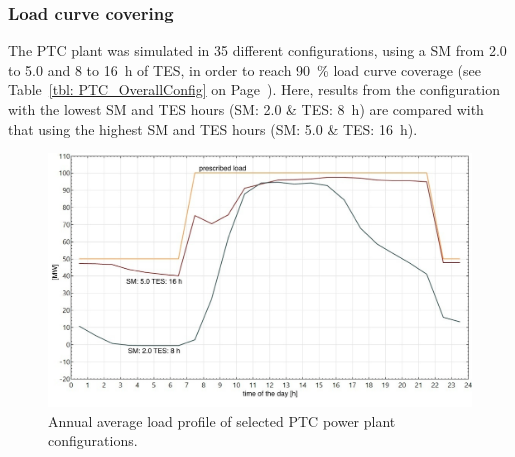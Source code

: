 \subsubsection{Load curve covering}
The PTC plant was simulated in 35 different configurations, using a SM from \num{2.0} to \num{5.0} and \num{8} to \SI{16}{h} of TES, in order to reach \SI{90}{\percent} load curve coverage (see Table~\ref{tbl: PTC_OverallConfig} on Page~\pageref{tbl: PTC_OverallConfig}). Here, results from the configuration with the lowest SM and TES hours (SM: \num{2.0} \& TES: \SI{8}{h}) are compared with that using the highest SM and TES hours  (SM: \num{5.0} \& TES: \SI{16}{h}).  

\begin{figure}[htbp]  
\centering
\includegraphics[width=0.8\linewidth]{FIG/PTC_annual_profil}
\caption[Annual average load profile of selected PTC power plant configurations.]{Annual average load profile of selected PTC power plant configurations.}\label{PTC_annual_profil}
\end{figure}

